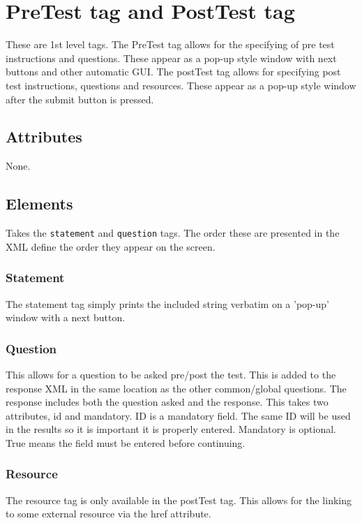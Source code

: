 \documentclass{article}
\begin{document}
\section {PreTest tag and PostTest tag}

These are 1st level tags. The PreTest tag allows for the specifying of pre test instructions and questions. These appear as a pop-up style window with next buttons and other automatic GUI. The postTest tag allows for specifying post test instructions, questions and resources. These appear as a pop-up style window after the submit button is pressed.

\subsection{Attributes}
None.

\subsection{Elements}
Takes the \texttt{statement} and \texttt{question} tags. The order these are presented in the XML define the order they appear on the screen.

\subsubsection{Statement}

The statement tag simply prints the included string verbatim on a 'pop-up' window with a next button.

\subsubsection{Question}

This allows for a question to be asked pre/post the test. This is added to the response XML in the same location as the other common/global questions. The response includes both the question asked and the response. This takes two attributes, id and mandatory. ID is a mandatory field. The same ID will be used in the results so it is important it is properly entered. Mandatory is optional. True means the field must be entered before continuing.

\subsubsection{Resource}

The resource tag is only available in the postTest tag. This allows for the linking to some external resource via the href attribute.
\end{document}
